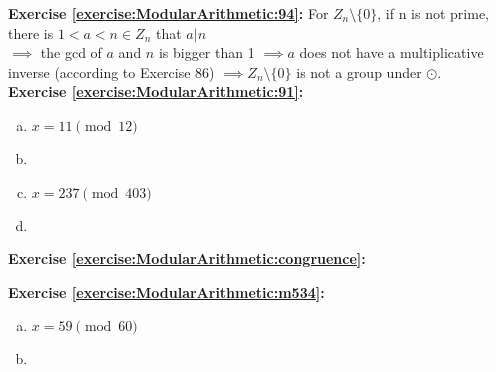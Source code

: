 \noindent\textbf{Exercise \ref{exercise:ModularArithmetic:94}:}
For $Z_n \setminus \{0\}$, if n is not prime, there is $1<a<n \in Z_n$ that $a|n$\\
$\implies$  the gcd of $a$ and $n$ is bigger than 1 $\implies a$ does not have a multiplicative inverse (according to Exercise 86) $\implies Z_n \setminus \{0\}$ is not a group under $\odot$.\\

\noindent\textbf{Exercise \ref{exercise:ModularArithmetic:91}:} 
\begin{enumerate}[(a)]
\item
$x=11 \pmod{12}$

\item

\item
$x=237 \pmod{403}$

\item
\end {enumerate}

\noindent\textbf{Exercise \ref{exercise:ModularArithmetic:congruence}:}

\noindent\textbf{Exercise \ref{exercise:ModularArithmetic:m534}:}%
\begin{enumerate}[(a)]
\item
$x=59 \pmod{60}$

\item
\end {enumerate}

